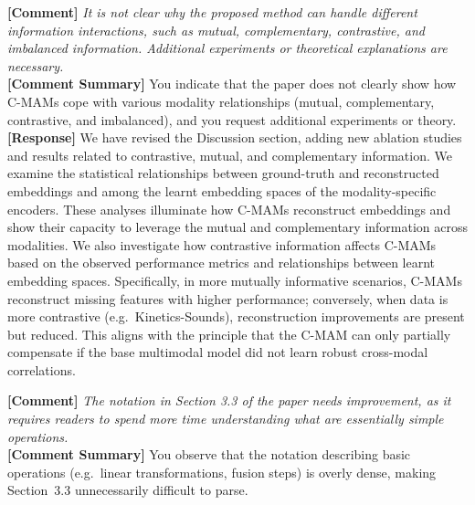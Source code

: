 \documentclass{article}
\begin{document}
\noindent\textbf{[Comment]} \textit{It is not clear why the proposed method can handle different information interactions, such as mutual, complementary,
contrastive, and imbalanced information. Additional experiments or theoretical explanations are necessary.}
\\

\noindent\textbf{[Comment Summary]} You indicate that the paper does not clearly show how C-MAMs cope with various modality relationships (mutual, complementary, contrastive, and imbalanced), and you request additional experiments or theory.
\\

\noindent\textbf{[Response]} We have revised the Discussion section, adding new ablation studies and results related to contrastive, mutual, and complementary information. We examine the statistical relationships between ground-truth and reconstructed embeddings and among the learnt embedding spaces of the modality-specific encoders. These analyses illuminate how C-MAMs reconstruct embeddings and show their capacity to leverage the mutual and complementary information across modalities. We also investigate how contrastive information affects C-MAMs based on the observed performance metrics and relationships between learnt embedding spaces. Specifically, in more mutually informative scenarios, C-MAMs reconstruct missing features with higher performance; conversely, when data is more contrastive (e.g.\ Kinetics-Sounds), reconstruction improvements are present but reduced. This aligns with the principle that the C-MAM can only partially compensate if the base multimodal model did not learn robust cross-modal correlations.

\vspace{0.25cm}
\hline
\vspace{0.25cm}

\noindent\textbf{[Comment]} \textit{The notation in Section 3.3 of the paper needs improvement, as it requires readers to spend more time understanding what
are essentially simple operations.}
\\

\noindent\textbf{[Comment Summary]} You observe that the notation describing basic operations (e.g.\ linear transformations, fusion steps) is overly dense, making Section~3.3 unnecessarily difficult to parse.
\\
\end{document}
